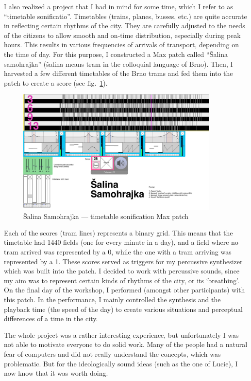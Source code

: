 \documentclass[12pt,a4paper,oneside]{report}
\begin{document}
I also realized a project that I had in mind for some time, which I refer to as ``timetable sonificatio''. Timetables (trains, planes, busses, etc.) are quite accurate in reflecting certain rhythms of the city. They are carefully adjusted to the needs of the citizens to allow smooth and on-time distribution, especially during peak hours. This results in various frequencies of arrivals of transport, depending on the time of day. For this purpose, I constructed a Max patch called ``Šalina samohrajka'' (šalina means tram in the colloquial language of Brno). Then, I harvested a few different timetables of the Brno trams and fed them into the patch to create a score (see fig.~\ref{fig:salina}).

\begin{figure}  
  \centering
    \includegraphics[width=0.9\textwidth]{img/salina}
        \caption{Šalina Samohrajka --- timetable sonification Max patch}
        \label{fig:salina}
\end{figure}

Each of the scores (tram lines) represents a binary grid. This means that the timetable had 1440 fields (one for every minute in a day), and a field where no tram arrived was represented by a 0, while the one with a tram arriving was represented by a 1. These scores served as triggers for my percussive synthesizer which was built into the patch. I decided to work with percussive sounds, since my aim was to represent certain kinds of rhythms of the city, or its `breathing'. On the final day of the workshop, I performed (amongst other participants) with this patch. In the performance, I mainly controlled the synthesis and the playback time (the speed of the day) to create various situations and perceptual differences of a time in the city. 

The whole project was a rather interesting experience, but unfortunately I was not able to motivate everyone to do solid work. Many of the people had a natural fear of computers and did not really understand the concepts, which was problematic. But for the ideologically sound ideas (such as the one of Lucie), I now know that it was worth doing.
\end{document}
